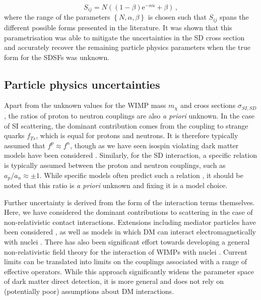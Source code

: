 \begin{equation}
\label{eq:SDparametrisation}
S_{ij} = N ((1-\beta)\mathrm{e}^{-\alpha u} + \beta)\,,
\end{equation}
where the range of the parameters $\left\{N, \alpha, \beta\right\}$ is chosen such that $S_{ij}$ spans the different possible forms presented in the literature. It was shown that this parametrisation was able to mitigate the uncertainties in the SD cross section and accurately recover the remaining particle physics parameters when the true form for the SDSFs was unknown.

\subsection{Particle physics uncertainties}

Apart from the unknown values for the WIMP mass $m_\chi$ and cross sections $\sigma_{SI,SD}$, the ratios of proton to neutron couplings are also \textit{a priori} unknown. In the case of SI scattering, the dominant contribution comes from the coupling to strange quarks $f_{Ts}$, which is equal for protons and neutrons. It is therefore typically assumed that $f^p \approx f^n$, though as we have seen isospin violating dark matter models have been considered \cite{Feng:2011, Kumar:2012,Hamaguchi:2014}. Similarly, for the SD interaction, a specific relation is typically assumed between the proton and neutron couplings, such as $a_p/a_n \approx \pm1$. While specific models often predict such a relation \cite{}, it should be noted that this ratio is \textit{a priori} unknown and fixing it is a model choice.

Further uncertainty is derived from the form of the interaction terms themselves. Here, we have considered the dominant contributions to scattering in the case of non-relativistic contact interactions. Extensions including mediator particles have been considered \cite{Schmidt-Hoberg:2013, An:2014}, as well as models in which DM can interact electromagnetically with nuclei \cite{Pospelov:2000, Ho:2013}. There has also been significant effort towards developing a general non-relativistic field theory for the interaction of WIMPs with nuclei \cite{Kurylov:2003,Fan:2010,Cirelli:2013,Fitzpatrick:2013}. Current limits can be translated into limits on the couplings associated with a range of effective operators. While this approach significantly widens the parameter space of dark matter direct detection, it is more general and does not rely on (potentially poor) assumptions about DM interactions.

